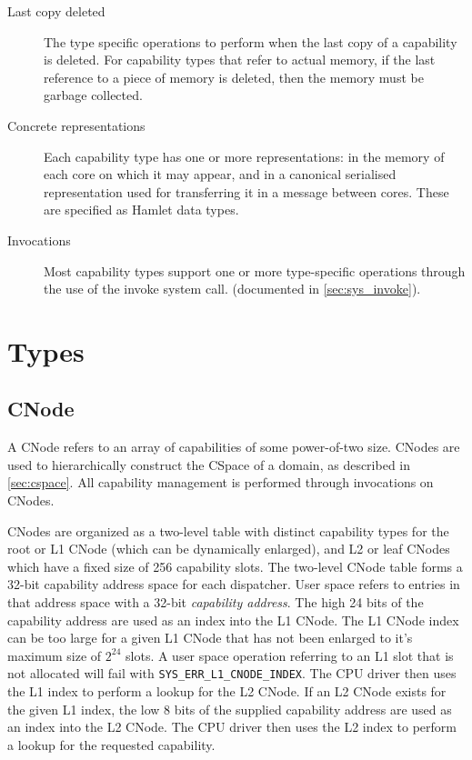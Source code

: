 \begin{description}
\item[Last copy deleted] The type specific operations to perform when
  the last copy of a capability is deleted. For capability types
    that refer to actual memory, if the last reference to a piece of
    memory is deleted, then the memory must be garbage collected.

\item[Concrete representations] Each capability type has one or more
  representations: in the memory of each core on which it may appear,
  and in a canonical serialised representation used for transferring
  it in a message between cores. These are specified as
  Hamlet\cite{dagand:fof:plos09} data types.

\item[Invocations] Most capability types support one or more
  type-specific operations through the use of the invoke system call.
  (documented in \ref{sec:sys_invoke}).
\end{description}

\section{Types}
  
\subsection{CNode}\label{sec:cnode}

A CNode refers to an array of capabilities of some power-of-two size.
CNodes are used to hierarchically construct the CSpace of a domain, as
described in \ref{sec:cspace}.  All capability management is
performed through invocations on CNodes.

CNodes are organized as a two-level table with distinct capability types for
the root or L1 CNode (which can be dynamically enlarged), and L2 or leaf
CNodes which have a fixed size of 256 capability slots.
The two-level CNode table forms a 32-bit capability address space for each
dispatcher.
User space refers to entries in that address space with a 32-bit
\emph{capability address}.
The high 24 bits of the capability address are used as an index into the L1
CNode.
The L1 CNode index can be too large for a given L1 CNode that has not been
enlarged to it's maximum size of $2^{24}$ slots.
A user space operation referring to an L1 slot that is not allocated will fail
with \verb|SYS_ERR_L1_CNODE_INDEX|.
The CPU driver then uses the L1 index to perform a lookup for the L2 CNode.
If an L2 CNode exists for the given L1 index, the low 8 bits of the supplied
capability address are used as an index into the L2 CNode.
The CPU driver then uses the L2 index to perform a lookup for the requested
capability.

